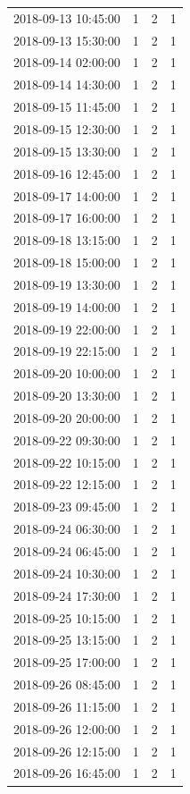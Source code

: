 \begin{tabular}{lrrr}
2018-09-13 10:45:00 & 1 & 2 & 1 \\
2018-09-13 15:30:00 & 1 & 2 & 1 \\
2018-09-14 02:00:00 & 1 & 2 & 1 \\
2018-09-14 14:30:00 & 1 & 2 & 1 \\
2018-09-15 11:45:00 & 1 & 2 & 1 \\
2018-09-15 12:30:00 & 1 & 2 & 1 \\
2018-09-15 13:30:00 & 1 & 2 & 1 \\
2018-09-16 12:45:00 & 1 & 2 & 1 \\
2018-09-17 14:00:00 & 1 & 2 & 1 \\
2018-09-17 16:00:00 & 1 & 2 & 1 \\
2018-09-18 13:15:00 & 1 & 2 & 1 \\
2018-09-18 15:00:00 & 1 & 2 & 1 \\
2018-09-19 13:30:00 & 1 & 2 & 1 \\
2018-09-19 14:00:00 & 1 & 2 & 1 \\
2018-09-19 22:00:00 & 1 & 2 & 1 \\
2018-09-19 22:15:00 & 1 & 2 & 1 \\
2018-09-20 10:00:00 & 1 & 2 & 1 \\
2018-09-20 13:30:00 & 1 & 2 & 1 \\
2018-09-20 20:00:00 & 1 & 2 & 1 \\
2018-09-22 09:30:00 & 1 & 2 & 1 \\
2018-09-22 10:15:00 & 1 & 2 & 1 \\
2018-09-22 12:15:00 & 1 & 2 & 1 \\
2018-09-23 09:45:00 & 1 & 2 & 1 \\
2018-09-24 06:30:00 & 1 & 2 & 1 \\
2018-09-24 06:45:00 & 1 & 2 & 1 \\
2018-09-24 10:30:00 & 1 & 2 & 1 \\
2018-09-24 17:30:00 & 1 & 2 & 1 \\
2018-09-25 10:15:00 & 1 & 2 & 1 \\
2018-09-25 13:15:00 & 1 & 2 & 1 \\
2018-09-25 17:00:00 & 1 & 2 & 1 \\
2018-09-26 08:45:00 & 1 & 2 & 1 \\
2018-09-26 11:15:00 & 1 & 2 & 1 \\
2018-09-26 12:00:00 & 1 & 2 & 1 \\
2018-09-26 12:15:00 & 1 & 2 & 1 \\
2018-09-26 16:45:00 & 1 & 2 & 1 \\

\end{tabular}
